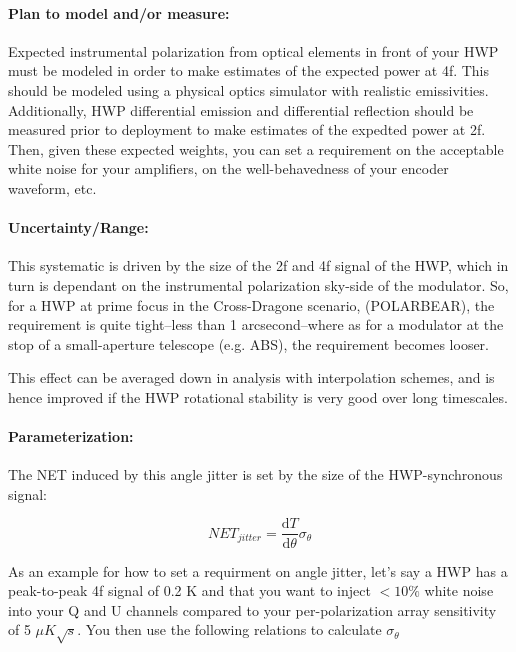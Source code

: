 \paragraph{Plan to model and/or measure:}

Expected instrumental polarization from optical elements in front of your HWP must be modeled in order to make estimates of the expected power at 4f. This should be modeled using a physical optics simulator with realistic emissivities. Additionally, HWP differential emission and differential reflection should be measured prior to deployment to make estimates of the expedted power at 2f. Then, given these expected weights, you can set a requirement on the acceptable white noise for your amplifiers, on the well-behavedness of your encoder waveform, etc.

\paragraph{Uncertainty/Range:}

This systematic is driven by the size of the 2f and 4f signal of the HWP, which in turn is dependant on the instrumental polarization sky-side of the modulator. So, for a HWP at prime focus in the Cross-Dragone scenario, (POLARBEAR), the requirement is quite tight--less than 1 arcsecond--where as for a modulator at the stop of a small-aperture telescope (e.g. ABS), the requirement becomes looser.

This effect can be averaged down in analysis with interpolation schemes, and is hence improved if the HWP rotational stability is very good over long timescales.

\paragraph{Parameterization:}

The NET induced by this angle jitter is set by the size of the HWP-synchronous signal:
 
 \begin{equation}
 	NET_{jitter} = \frac{\mathrm{d}T}{\mathrm{d}\theta} \sigma_{\theta} 
 \end{equation}

As an example for how to set a requirment on angle jitter, let's say a HWP has a peak-to-peak 4f signal of 0.2 K and that you want to inject $< 10 \%$ white noise into your Q and U channels compared to your per-polarization array sensitivity of 5 $\mu K \sqrt{s}$. You then use the following relations to calculate $\sigma_{\theta}$

